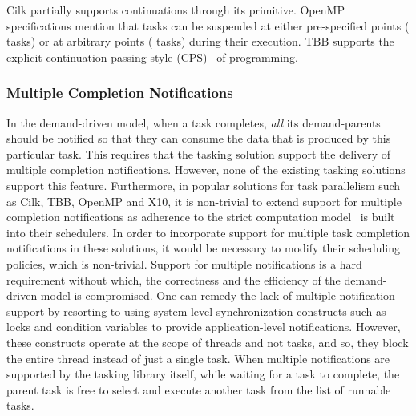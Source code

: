 \documentclass[10pt,conference]{IEEEtran}
\begin{document}
Cilk partially supports continuations through its  primitive.
OpenMP specifications mention that tasks can be suspended at either
pre-specified points ( tasks) or at arbitrary points (
tasks) during their execution.  TBB supports the explicit continuation passing
style (CPS)~\cite{OliverCPS} of programming. 

\subsubsection{Multiple Completion Notifications}
In the demand-driven model, when a task completes, \textit{all} its
demand-parents should be notified so that they can consume the data that is
produced by this particular task. This requires that the tasking solution
support the delivery of multiple completion notifications. 
However,  none of the existing tasking solutions support this feature.
Furthermore, in popular solutions for task parallelism such as Cilk, TBB,
OpenMP and X10, it is non-trivial to extend support for multiple completion
notifications as adherence to the strict computation model~\cite{Blumofe94} is
built into their schedulers.  In order to incorporate support for multiple task
completion notifications in these solutions, it would be necessary to modify 
their scheduling policies, which is non-trivial.
Support for multiple notifications is a hard requirement without which, the
correctness and the efficiency of the demand-driven model is compromised.  One
can remedy the lack of multiple notification support by resorting to using
system-level synchronization constructs such as locks and condition variables
to provide application-level notifications. However, these constructs operate
at the scope of threads and not tasks, and so, they block the entire thread
instead of just a single task.  When multiple notifications are supported by
the tasking library itself, while waiting for a task to complete, the parent
task is free to select and execute another task from the list of runnable
tasks.
\end{document}
